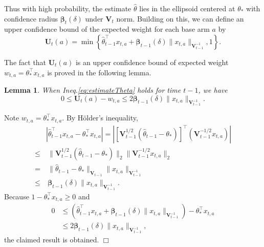 \documentclass{article}
\newcommand{\bbeta}{\boldsymbol{\beta}}
\newcommand{\bU}{\mathbf{U}}
\newcommand{\bV}{\mathbf{V}}
\newcommand{\abs}[1]{\left| #1 \right|}
\newcommand{\norm}[1]{\| #1 \|}
\newtheorem{lemma}[theorem]{Lemma}%
\newenvironment{proof}{\noindent {\textbf{Proof. }}}{$\Box$ \medskip}
\begin{document}
Thus with high probability, the estimate $\hat{\theta}$ lies in the ellipsoid centered at $\theta_*$ with confidence radius $\bbeta_t(\delta)$ under $\bV_t$ norm. 
Building on this, we can define an upper confidence bound of the expected weight for each base arm $a$ by
\begin{equation}
  \label{eq:defU}
  \bU_t(a) = \min\left\{\hat{\theta}_{t-1}^{\top}x_{t,a} + \bbeta_{t-1}(\delta)\norm{x_{t,a}}_{\bV_{t-1}^{-1}}, 1 \right\}.
\end{equation}

The fact that $\bU_t(a)$ is an upper confidence bound of expected weight $w_{t, a} = \theta_*^{\top} x_{t,a}$ is proved in the following lemma.
\begin{lemma} %
  \label{lem:estimateU}
  When Ineq.\eqref{eq:estimateTheta} holds for time $t-1$, we have
  $$
    0 \leq \bU_t(a) - w_{t,a} \leq 2 \bbeta_{t-1}(\delta)\norm{x_{t,a}}_{\bV_{t-1}^{-1}}.
  $$
\end{lemma}
\begin{proof}
	Note $w_{t,a} = \theta_*^{\top} x_{t,a}$. By H\"{o}lder's inequality,
	\begin{align*}
		&\abs{\hat{\theta}_{t-1}^{\top}x_{t,a} - \theta_{\ast}^{\top}x_{t,a}} = \abs{[\bV_{t-1}^{1/2}(\hat{\theta}_{t-1} - \theta_{\ast})]^{\top} (\bV_{t-1}^{-1/2}x_{t,a})}\\
		\leq &~\norm{\bV_{t-1}^{1/2}(\hat{\theta}_{t-1} - \theta_{\ast})}_2 \norm{\bV_{t-1}^{-1/2}x_{t,a}}_2\\
		=&~\norm{\hat{\theta}_{t-1} - \theta_{\ast}}_{\bV_{t-1}} \norm{x_{t,a}}_{\bV_{t-1}^{-1}} \\
		\leq&~ \bbeta_{t-1}(\delta)\norm{x_{t,a}}_{\bV_{t-1}^{-1}}.
	\end{align*}
	Because $1 - \theta_*^{\top} x_{t,a} \geq 0$ and
	\begin{align*}
		0 &\leq (\hat{\theta}_{t-1}^{\top}x_{t,a} + \bbeta_{t-1}(\delta)\norm{x_{t,a}}_{\bV_{t-1}^{-1}}) - \theta_{\ast}^{\top}x_{t,a} \\
		&\leq 2 \bbeta_{t-1}(\delta)\norm{x_{t,a}}_{\bV_{t-1}^{-1}},
	\end{align*}
	the claimed result is obtained.
\end{proof}
\end{document}
